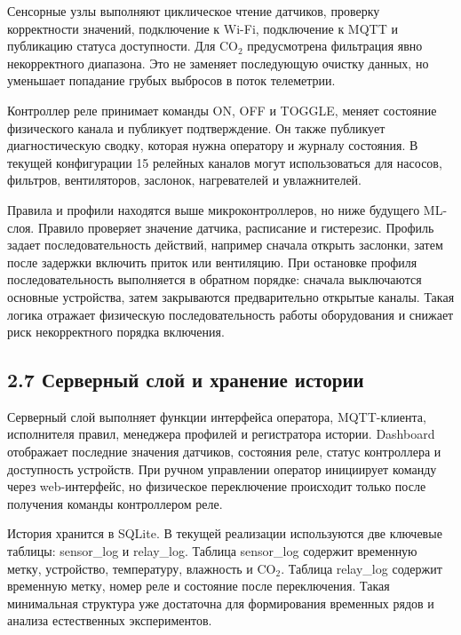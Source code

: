 \documentclass[a4paper,14pt]{extarticle}
\renewcommand{\texttt}[1]{\textnormal{#1}}
\begin{document}
Сенсорные узлы выполняют циклическое чтение датчиков, проверку
корректности значений, подключение к Wi-Fi, подключение к MQTT и
публикацию статуса доступности. Для CO\(_2\) предусмотрена фильтрация
явно некорректного диапазона. Это не заменяет последующую очистку
данных, но уменьшает попадание грубых выбросов в поток телеметрии.

Контроллер реле принимает команды \texttt{ON}, \texttt{OFF} и
\texttt{TOGGLE}, меняет состояние физического канала и публикует
подтверждение. Он также публикует диагностическую сводку, которая нужна
оператору и журналу состояния. В текущей конфигурации 15 релейных
каналов могут использоваться для насосов, фильтров, вентиляторов,
заслонок, нагревателей и увлажнителей.

Правила и профили находятся выше микроконтроллеров, но ниже будущего
ML-слоя. Правило проверяет значение датчика, расписание и гистерезис.
Профиль задает последовательность действий, например сначала открыть
заслонки, затем после задержки включить приток или вентиляцию. При
остановке профиля последовательность выполняется в обратном порядке:
сначала выключаются основные устройства, затем закрываются
предварительно открытые каналы. Такая логика отражает физическую
последовательность работы оборудования и снижает риск некорректного
порядка включения.

\subsection{2.7 Серверный слой и хранение
истории}\label{ux441ux435ux440ux432ux435ux440ux43dux44bux439-ux441ux43bux43eux439-ux438-ux445ux440ux430ux43dux435ux43dux438ux435-ux438ux441ux442ux43eux440ux438ux438}

Серверный слой выполняет функции интерфейса оператора, MQTT-клиента,
исполнителя правил, менеджера профилей и регистратора истории. Dashboard
отображает последние значения датчиков, состояния реле, статус
контроллера и доступность устройств. При ручном управлении оператор
инициирует команду через web-интерфейс, но физическое переключение
происходит только после получения команды контроллером реле.

История хранится в SQLite. В текущей реализации используются две
ключевые таблицы: \texttt{sensor\_log} и \texttt{relay\_log}. Таблица
\texttt{sensor\_log} содержит временную метку, устройство, температуру,
влажность и CO\(_2\). Таблица \texttt{relay\_log} содержит временную
метку, номер реле и состояние после переключения. Такая минимальная
структура уже достаточна для формирования временных рядов и анализа
естественных экспериментов.
\end{document}
